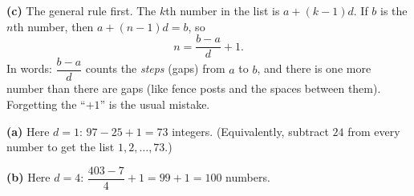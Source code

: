\textbf{(c)} The general rule first. The $k$th number in the list is $a+(k-1)d$. If $b$ is the $n$th number, then $a+(n-1)d=b$, so
\[n=\dfrac{b-a}{d}+1.\]
In words: $\dfrac{b-a}{d}$ counts the \emph{steps} (gaps) from $a$ to $b$, and there is one more number than there are gaps (like fence posts and the spaces between them). Forgetting the ``$+1$'' is the usual mistake.

\textbf{(a)} Here $d=1$: $97-25+1=\boxed{73}$ integers. (Equivalently, subtract $24$ from every number to get the list $1,2,\ldots,73$.)

\textbf{(b)} Here $d=4$: $\dfrac{403-7}{4}+1=99+1=\boxed{100}$ numbers.
